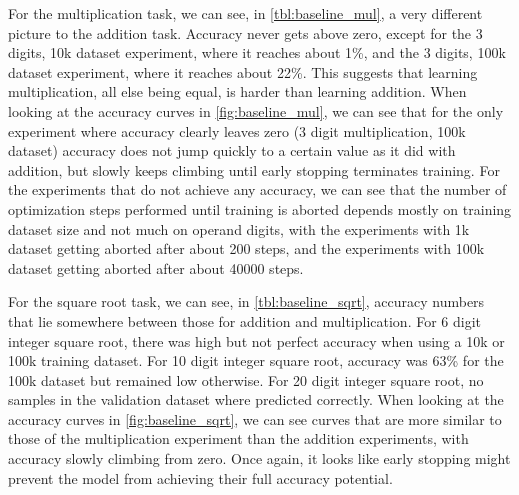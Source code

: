 For the multiplication task, we can see, in \cref{tbl:baseline_mul}, a very different picture to the addition task. Accuracy never gets above zero, except for the 3 digits, 10k dataset experiment, where it reaches about 1\%, and the 3 digits, 100k dataset experiment, where it reaches about 22\%.
This suggests that learning multiplication, all else being equal, is harder than learning addition.
When looking at the accuracy curves in  \cref{fig:baseline_mul}, we can see that for the only experiment where accuracy clearly leaves zero (3 digit multiplication, 100k dataset) accuracy does not jump quickly to a certain value as it did with addition, but slowly keeps climbing until early stopping terminates training.
For the experiments that do not achieve any accuracy, we can see that the number of optimization steps performed until training is aborted depends mostly on training dataset size and not much on operand digits, with the experiments with 1k dataset getting aborted after about 200 steps, and the experiments with 100k dataset getting aborted after about 40000 steps.


For the square root task, we can see, in \cref{tbl:baseline_sqrt}, accuracy numbers that lie somewhere between those for addition and multiplication.
For 6 digit integer square root, there was high but not perfect accuracy when using a 10k or 100k training dataset.
For 10 digit integer square root, accuracy was 63\% for the 100k dataset but remained low otherwise. For 20 digit integer square root, no samples in the validation dataset where predicted correctly.
When looking at the accuracy curves in \cref{fig:baseline_sqrt}, we can see curves that are more similar to those of the multiplication experiment than the addition experiments, with accuracy slowly climbing from zero. Once again, it looks like early stopping might prevent the model from achieving their full accuracy potential.







